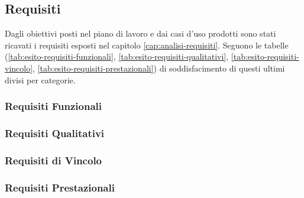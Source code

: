\subsection{Requisiti}
Dagli obiettivi posti nel piano di lavoro e dai casi d'uso prodotti sono stati ricavati i requisiti esposti nel capitolo \ref{cap:analisi-requisiti}. Seguono le tabelle (\ref{tab:esito-requisiti-funzionali}, \ref{tab:esito-requisiti-qualitativi}, \ref{tab:esito-requisiti-vincolo}, \ref{tab:esito-requisiti-prestazionali}) di soddisfacimento di questi ultimi divisi per categorie.

\subsubsection{Requisiti Funzionali}

\subsubsection{Requisiti Qualitativi}

\subsubsection{Requisiti di Vincolo}

\subsubsection{Requisiti Prestazionali}

